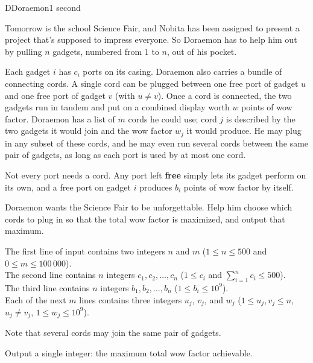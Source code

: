 \begin{problem}{D}{Doraemon}{1 second}

\noindent
Tomorrow is the school Science Fair, and Nobita has been assigned to present a project that's supposed to impress everyone.
So Doraemon has to help him out by pulling $n$ gadgets, numbered from $1$ to $n$, out of his pocket.

\noindent
Each gadget $i$ has $c_i$ ports on its casing. 
Doraemon also carries a bundle of connecting cords. 
A single cord can be plugged between one free port of gadget $u$ and one free port of gadget $v$ (with $u \neq v$). 
Once a cord is connected, the two gadgets run in tandem and put on a combined display worth $w$ points of wow factor. 
Doraemon has a list of $m$ cords he could use; cord $j$ is described by the two gadgets it would join and the wow factor $w_j$ it would produce. 
He may plug in any subset of these cords, and he may even run several cords between the same pair of gadgets, as long as each port is used by at most one cord.

\noindent
Not every port needs a cord. 
Any port left \textbf{free} simply lets its gadget perform on its own, and a free port on gadget $i$ produces $b_i$ points of wow factor by itself.

\noindent
Doraemon wants the Science Fair to be unforgettable.
Help him choose which cords to plug in so that the total wow factor is maximized, and output that maximum.

\InputFile

\noindent
The first line of input contains two integers $n$ and $m$ ($1 \le n \le 500$ and
$0 \le m \le 100\,000$).\\
The second line contains $n$ integers $c_1, c_2, \ldots, c_n$ ($1 \le c_i$ and
$\sum_{i=1}^{n} c_i \le 500$).\\
The third line contains $n$ integers $b_1, b_2, \ldots, b_n$ ($1 \le b_i \le 10^9$).\\
Each of the next $m$ lines contains three integers $u_j$, $v_j$, and $w_j$
($1 \le u_j, v_j \le n$, $u_j \neq v_j$, $1 \le w_j \le 10^9$).

\noindent
Note that several cords may join the same pair of gadgets.

\OutputFile

\noindent
Output a single integer: the maximum total wow factor achievable.

\begin{example}
\end{example}

\end{problem}